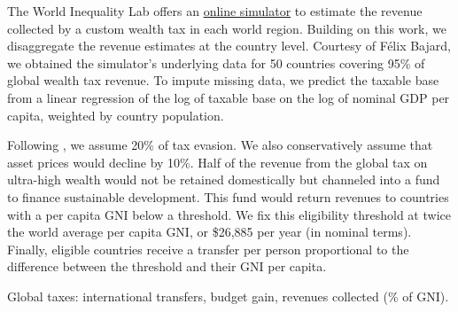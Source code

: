 \documentclass[12pt,english]{article}
\begin{document}
\begin{bibunit}
The World Inequality Lab offers an \href{https://wid.world/world-wealth-tax-simulator/}{online simulator} to estimate the revenue collected by a custom wealth tax in each world region. Building on this work, we disaggregate the revenue estimates at the country level. Courtesy of Félix Bajard, we obtained the simulator's underlying data for 50 countries covering 95\% of global wealth tax revenue. To impute missing data, we predict the taxable base from a linear regression of the log of taxable base on the log of nominal GDP per capita, weighted by country population. 

Following \cite{zucman_blueprint_2024}, we assume 20\% of tax evasion. We also conservatively assume that asset prices would decline by 10\%. Half of the revenue from the global tax on ultra-high wealth would not be retained domestically but channeled into a fund to finance sustainable development. This fund would return revenues to countries with a per capita GNI below a threshold. We fix this eligibility threshold at twice the world average per capita GNI, or \$26,885 per year (in nominal terms). Finally, eligible countries receive a transfer per person %
proportional to the difference between the threshold and their GNI per capita.

\begin{table}[!h]
  \caption{\label{tab:transfers_gain}Global taxes: international transfers, budget gain, revenues collected (\% of GNI). }
  \makebox[\textwidth][c]{
  
}
\end{table}
\end{bibunit}
\end{document}
